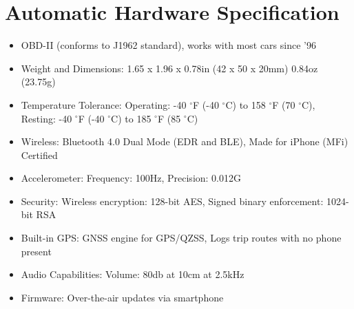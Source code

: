 \section*{Automatic Hardware Specification} %
\label{sec:automatic_hardware_specification}

\begin{itemize}
\item OBD-II (conforms to J1962 standard), works with most cars since ’96
\item Weight and Dimensions: 1.65 x 1.96 x 0.78in (42 x 50 x 20mm) 0.84oz (23.75g)
\item Temperature Tolerance: Operating: -40 \ensuremath{^\circ}F (-40 \ensuremath{^\circ}C) to 158 \ensuremath{^\circ}F (70 \ensuremath{^\circ}C), Resting: -40 \ensuremath{^\circ}F (-40 \ensuremath{^\circ}C) to 185 \ensuremath{^\circ}F (85 \ensuremath{^\circ}C)
\item Wireless: Bluetooth 4.0 Dual Mode (EDR and BLE), Made for iPhone (MFi) Certified
\item Accelerometer: Frequency: 100Hz, Precision: 0.012G
\item Security: Wireless encryption: 128-bit AES, Signed binary enforcement: 1024-bit RSA
\item Built-in GPS: GNSS engine for GPS/QZSS, Logs trip routes with no phone present
\item Audio Capabilities: Volume: 80db at 10cm at 2.5kHz
\item Firmware: Over-the-air updates via smartphone
\end{itemize}
